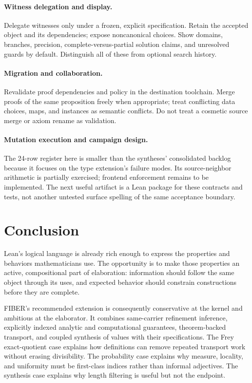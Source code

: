 \documentclass[11pt,letterpaper]{article}
\theoremstyle{definition}\newtheorem{definition}[theorem]{Definition}
\begin{document}
\paragraph{Witness delegation and display.}
Delegate witnesses only under a frozen, explicit specification. Retain the accepted object and its dependencies; expose noncanonical choices. Show domains, branches, precision, complete-versus-partial solution claims, and unresolved guards by default. Distinguish all of these from optional search history.

\paragraph{Migration and collaboration.}
Revalidate proof dependencies and policy in the destination toolchain. Merge proofs of the same proposition freely when appropriate; treat conflicting data choices, maps, and instances as semantic conflicts. Do not treat a cosmetic source merge or axiom rename as validation.

\paragraph{Mutation execution and campaign design.}
The 24-row register here is smaller than the syntheses' consolidated backlog because it focuses on the type extension's failure modes. Its source-neighbor arithmetic is partially exercised; frontend enforcement remains to be implemented. The next useful artifact is a Lean package for these contracts and tests, not another untested surface spelling of the same acceptance boundary.

\section{Conclusion}
Lean's logical language is already rich enough to express the properties and behaviors mathematicians use. The opportunity is to make those properties an active, compositional part of elaboration: information should follow the same object through its uses, and expected behavior should constrain constructions before they are complete.

FIBER's recommended extension is consequently conservative at the kernel and ambitious at the elaborator. It combines same-carrier refinement inference, explicitly indexed analytic and computational guarantees, theorem-backed transport, and coupled synthesis of values with their specifications. The Frey exact-quotient case explains how definitions can remove repeated transport work without erasing divisibility. The probability case explains why measure, locality, and uniformity must be first-class indices rather than informal adjectives. The synthesis case explains why length filtering is useful but not the endpoint.
\end{document}
